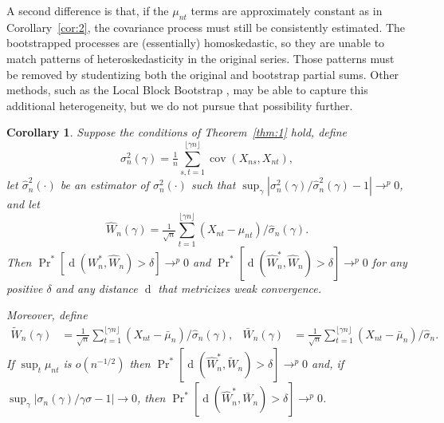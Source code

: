 \documentclass[11pt]{article}
\newtheorem{cor}{Corollary}
\theoremstyle{definition}
\DeclareMathOperator{\dist}{d}
\DeclareMathOperator{\cov}{cov}
\DeclareMathOperator{\pr}{Pr}
\begin{document}
A second difference is that, if the $\mu_{nt}$ terms are approximately
constant as in Corollary~\ref{cor:2}, the covariance process must
still be consistently estimated.  The bootstrapped processes are
(essentially) homoskedastic, so they are unable to match patterns of
heteroskedasticity in the original series.  Those patterns must be
removed by studentizing both the original and bootstrap partial sums.
Other methods, such
as the Local Block Bootstrap \citep{PaP:02,DPP:03}, may be able to
capture this additional heterogeneity, but we do not pursue that
possibility further.

\begin{cor}
  Suppose the conditions of Theorem~\ref{thm:1} hold, define
  \begin{equation}
    \label{eq:14}
    \sigma_n^2(\gamma) = \tfrac{1}{n}
    \sum_{s,t=1}^{\lfloor \gamma n \rfloor} \cov(X_{ns}, X_{nt}),
  \end{equation}
  let $\hat\sigma_n^2(\cdot)$ be an estimator of $\sigma_n^2(\cdot)$
  such that $\sup_{\gamma} |\sigma_n^2(\gamma) /
  \hat{\sigma}_n^2(\gamma) - 1| \to^p 0$, and let
  \begin{equation}
    \label{eq:8}
    \hat{W}_n(\gamma) = \tfrac{1}{\sqrt{n}} \sum_{t=1}^{\lfloor \gamma
      n \rfloor} (X_{nt} - \mu_{nt}) / \hat{\sigma}_{n}(\gamma).
  \end{equation}
  Then $\pr^{*}[\dist(W_n^{*}, \hat{W}_n) > \delta] \to^p 0$ and
  $\pr^{*}[\dist(\hat{W}_n^{*}, \hat{W}_n) > \delta] \to^p 0$ for any
  positive $\delta$ and any distance $\dist$ that metricizes weak
  convergence.  

  Moreover, define 
  \begin{align*}
    \tilde W_n(\gamma) &= \tfrac{1}{\sqrt{n}} \sum_{t=1}^{\lfloor \gamma
      n \rfloor} (X_{nt} - \bar \mu_{n}) / \hat{\sigma}_{n}(\gamma),
&    \bar W_n(\gamma) &= \tfrac{1}{\sqrt{n}} \sum_{t=1}^{\lfloor \gamma
      n \rfloor} (X_{nt} - \bar \mu_{n}) / \hat\sigma_n.
  \end{align*}
  If $\sup_t \mu_{nt}$ is $o(n^{-1/2})$ then
  $\pr^{*}[\dist(\hat{W}_n^{*}, \tilde{W}_n) > \delta] \to^p 0$ and, if 
  $\sup_\gamma | \sigma_n(\gamma) / \gamma \sigma - 1 | \to 0$, then
  $\pr^{*}[\dist(\hat{W}_n^{*}, \bar{W}_n) > \delta] \to^p 0$.
\end{cor}
\end{document}
